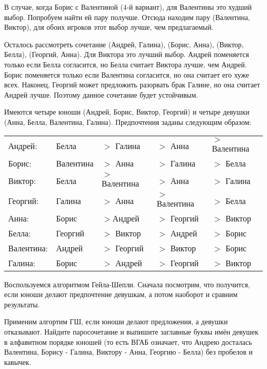 	В случае, когда Борис с Валентиной (4-й вариант), для Валентины это худший выбор. Попробуем найти ей пару получше. Отсюда находим пару (Валентина, Виктор), для обоих игроков этот выбор лучше, чем предлагаемый.
	
	Осталось рассмотреть сочетание (Андрей, Галина), (Борис, Анна), (Виктор, Белла), (Георгий, Анна). Для Виктора это лучший выбор. Андрей поменяется только если Белла согласится, но Белла считает Виктора лучше, чем Андрей. Борис поменяется только если Валентина согласится, но она считает его хуже всех. Наконец, Георгий может предложить разорвать брак Галине, но она считает Андрей лучше. Поэтому данное сочетание будет устойчивым.
	
	\task
		Имеются четыре юноши (Андрей, Борис, Виктор, Георгий) и четыре девушки (Анна, Белла, Валентина, Галина). Предпочтения заданы следующим образом:
	
	\begin{tabular}{lllll}
		\hline
		Андрей: &Белла &$>$ Галина &$>$ Анна &$>$ Валентина \\
		
		Борис: &Валентина &$>$ Анна &$>$ Галина &$>$ Белла \\
		
		Виктор: &Белла &$>$ Валентина &$>$ Анна &$>$ Галина \\
		
		Георгий: &Галина &$>$ Анна &$>$ Валентина &$>$ Белла \\
		
		Анна: &Борис &$>$Андрей &$>$ Георгий &$>$ Виктор \\
		
		Белла: &Георгий &$>$ Виктор &$>$ Андрей &$>$ Борис \\
		
		Валентина:&Андрей&$>$ Георгий &$>$ Виктор &$>$ Борис \\
		
		Галина: &Борис &$>$ Андрей &$>$ Георгий &$>$ Виктор \\
		\hline
	\end{tabular}

	Воспользуемся алгоритмом Гейла-Шепли. Сначала посмотрим, что получится, если юноши делают предпочтение девушкам, а потом наоборот и сравним результаты.
	
	Применим алгортим ГШ, если юноши делают предложения, а девушки отказывают. Найдите паросочетание и выпишите заглавные буквы имён девушек в алфавитном порядке юношей (то есть ВГАБ означает, что Андрею досталась Валентина, Борису - Галина, Виктору - Анна, Георгию - Белла) без пробелов и кавычек.
	
